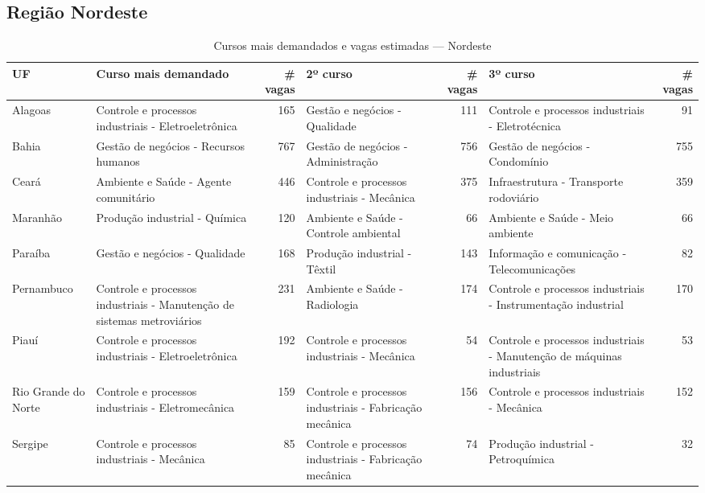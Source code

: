 \subsection{Região Nordeste}
\begin{table}[ht]
\centering
\caption{Cursos mais demandados e vagas estimadas — Nordeste}
\label{tab:nordeste}
\begin{tabular}{l l r l r l r}
\toprule
UF & Curso mais demandado & \# vagas & 2º curso & \# vagas & 3º curso & \# vagas \\
\midrule
Alagoas & Controle e processos industriais - Eletroeletrônica & 165 & Gestão e negócios - Qualidade & 111 & Controle e processos industriais - Eletrotécnica & 91 \\
Bahia & Gestão de negócios - Recursos humanos & 767 & Gestão de negócios - Administração & 756 & Gestão de negócios - Condomínio & 755 \\
Ceará & Ambiente e Saúde - Agente comunitário & 446 & Controle e processos industriais - Mecânica & 375 & Infraestrutura - Transporte rodoviário & 359 \\
Maranhão & Produção industrial - Química & 120 & Ambiente e Saúde - Controle ambiental & 66 & Ambiente e Saúde - Meio ambiente & 66 \\
Paraíba & Gestão e negócios - Qualidade & 168 & Produção industrial - Têxtil & 143 & Informação e comunicação - Telecomunicações & 82 \\
Pernambuco & Controle e processos industriais - Manutenção de sistemas metroviários & 231 & Ambiente e Saúde - Radiologia & 174 & Controle e processos industriais - Instrumentação industrial & 170 \\
Piauí & Controle e processos industriais - Eletroeletrônica & 192 & Controle e processos industriais - Mecânica & 54 & Controle e processos industriais - Manutenção de máquinas industriais & 53 \\
Rio Grande do Norte & Controle e processos industriais - Eletromecânica & 159 & Controle e processos industriais - Fabricação mecânica & 156 & Controle e processos industriais - Mecânica & 152 \\
Sergipe & Controle e processos industriais - Mecânica & 85 & Controle e processos industriais - Fabricação mecânica & 74 & Produção industrial - Petroquímica & 32 \\
\bottomrule
\end{tabular}
\end{table}

